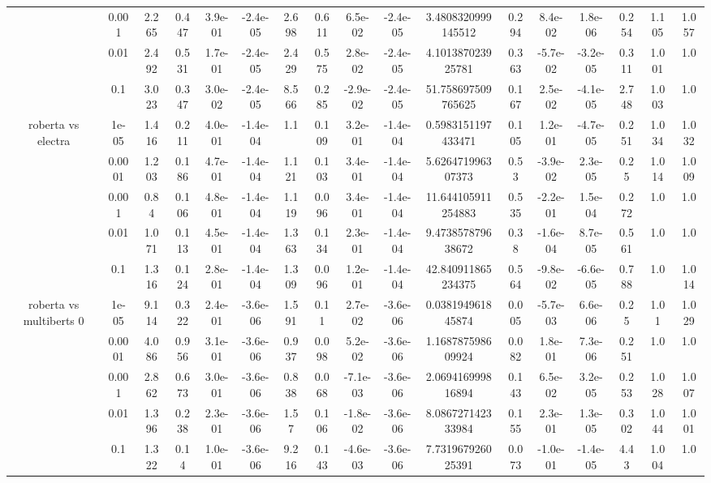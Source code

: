 \begin{tabular}{|c|c|c|c|c|c|c|c|c|c|c|c|c|c|c|c|c|}
 & 0.001 & 2.265 & 0.447 & 3.9e-01 & -2.4e-05 & 2.698 & 0.611 & 6.5e-02 & -2.4e-05 & 3.4808320999145512 & 0.294 & 8.4e-02 & 1.8e-06 & 0.254 & 1.105 & 1.057 \\
 & 0.01 & 2.492 & 0.531 & 1.7e-01 & -2.4e-05 & 2.429 & 0.575 & 2.8e-02 & -2.4e-05 & 4.101387023925781 & 0.363 & -5.7e-02 & -3.2e-05 & 0.311 & 1.001 & 1.0 \\
 & 0.1 & 3.023 & 0.347 & 3.0e-02 & -2.4e-05 & 8.566 & 0.285 & -2.9e-02 & -2.4e-05 & 51.758697509765625 & 0.167 & 2.5e-02 & -4.1e-05 & 2.748 & 1.003 & 1.0 \\
\hline
\multirow{5}{*}{roberta  vs electra } & 1e-05 & 1.416 & 0.211 & 4.0e-01 & -1.4e-04 & 1.1 & 0.109 & 3.2e-01 & -1.4e-04 & 0.5983151197433471 & 0.105 & 1.2e-01 & -4.7e-05 & 0.251 & 1.034 & 1.032 \\
 & 0.0001 & 1.203 & 0.186 & 4.7e-01 & -1.4e-04 & 1.121 & 0.103 & 3.4e-01 & -1.4e-04 & 5.626471996307373 & 0.53 & -3.9e-02 & 2.3e-05 & 0.25 & 1.014 & 1.009 \\
 & 0.001 & 0.84 & 0.106 & 4.8e-01 & -1.4e-04 & 1.119 & 0.096 & 3.4e-01 & -1.4e-04 & 11.644105911254883 & 0.535 & -2.2e-01 & 1.5e-04 & 0.272 & 1.0 & 1.0 \\
 & 0.01 & 1.071 & 0.113 & 4.5e-01 & -1.4e-04 & 1.363 & 0.134 & 2.3e-01 & -1.4e-04 & 9.473857879638672 & 0.38 & -1.6e-04 & 8.7e-05 & 0.561 & 1.0 & 1.0 \\
 & 0.1 & 1.316 & 0.124 & 2.8e-01 & -1.4e-04 & 1.309 & 0.096 & 1.2e-01 & -1.4e-04 & 42.840911865234375 & 0.564 & -9.8e-02 & -6.6e-05 & 0.788 & 1.0 & 1.014 \\
\hline
\multirow{5}{*}{roberta  vs multiberts 0} & 1e-05 & 9.114 & 0.322 & 2.4e-01 & -3.6e-06 & 1.591 & 0.11 & 2.7e-02 & -3.6e-06 & 0.038194961845874 & 0.005 & -5.7e-03 & 6.6e-06 & 0.25 & 1.01 & 1.029 \\
 & 0.0001 & 4.086 & 0.956 & 3.1e-01 & -3.6e-06 & 0.937 & 0.098 & 5.2e-02 & -3.6e-06 & 1.168787598609924 & 0.082 & 1.8e-01 & 7.3e-06 & 0.251 & 1.0 & 1.0 \\
 & 0.001 & 2.862 & 0.673 & 3.0e-01 & -3.6e-06 & 0.838 & 0.068 & -7.1e-03 & -3.6e-06 & 2.069416999816894 & 0.143 & 6.5e-02 & 3.2e-05 & 0.253 & 1.028 & 1.007 \\
 & 0.01 & 1.396 & 0.238 & 2.3e-01 & -3.6e-06 & 1.57 & 0.106 & -1.8e-02 & -3.6e-06 & 8.086727142333984 & 0.155 & 2.3e-01 & 1.3e-05 & 0.302 & 1.044 & 1.001 \\
 & 0.1 & 1.322 & 0.14 & 1.0e-01 & -3.6e-06 & 9.216 & 0.143 & -4.6e-03 & -3.6e-06 & 7.731967926025391 & 0.073 & -1.0e-01 & -1.4e-05 & 4.43 & 1.004 & 1.0 \\

\end{tabular}
